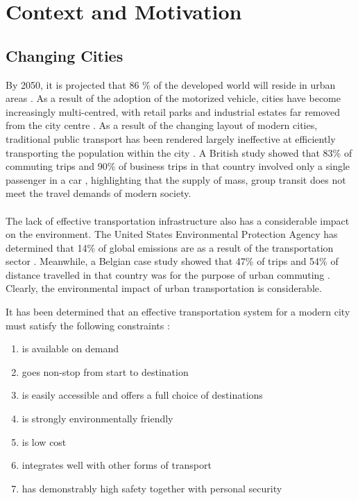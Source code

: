 \documentclass[12pt,letterpaper]{article}
\begin{document}
	
\section{Context and Motivation}

\subsection{Changing Cities}

By 2050, it is projected that 86 \% of the developed world will reside in urban areas \cite{Economist}. 
As a result of the adoption of the motorized vehicle, cities have become increasingly multi-centred, with retail parks and industrial estates far removed from the city centre \cite{SustainableTransport}. 
As a result of the changing layout of modern cities, traditional public transport has been rendered largely ineffective at efficiently transporting the population within the city \cite{SustainableTransport}. 
A British study showed that 83\% of commuting trips and 90\% of business trips in that country involved only a single passenger in a car \cite{NTS}, highlighting that the supply of mass, group transit does not meet the travel demands of modern society.
\\
\\
The lack of effective transportation infrastructure also has a considerable impact on the environment. 
The United States Environmental Protection Agency has determined that 14\% of global emissions are as a result of the transportation sector \cite{EPA}. 
Meanwhile, a Belgian case study showed that 47\% of trips and 54\% of distance travelled in that country was for the purpose of urban commuting \cite{Belgium}. 
Clearly, the environmental impact of urban transportation is considerable.

It has been determined that an effective transportation system for a modern city must satisfy the following constraints \cite{SustainableTransport}:

\begin{enumerate}
	\item is available on demand
	\item goes non-stop from start to destination
	\item is easily accessible and offers a full choice of destinations
	\item is strongly environmentally friendly
	\item is low cost
	\item integrates well with other forms of transport
	\item has demonstrably high safety together with personal security
\end{enumerate}
\end{document}
